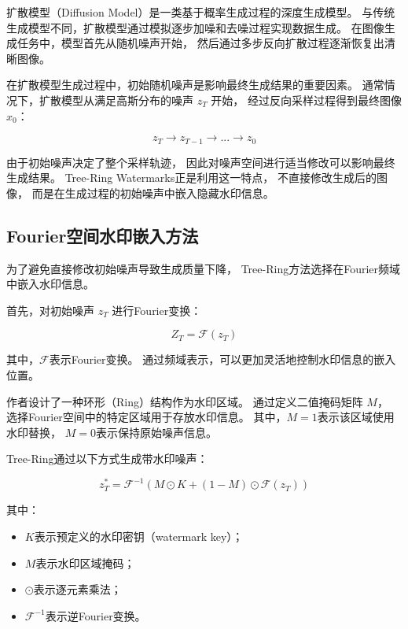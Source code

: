\documentclass[12pt,a4paper]{article}
\begin{document}
扩散模型（Diffusion Model）是一类基于概率生成过程的深度生成模型。
与传统生成模型不同，扩散模型通过模拟逐步加噪和去噪过程实现数据生成。
在图像生成任务中，模型首先从随机噪声开始，
然后通过多步反向扩散过程逐渐恢复出清晰图像。


在扩散模型生成过程中，初始随机噪声是影响最终生成结果的重要因素。
通常情况下，扩散模型从满足高斯分布的噪声 $z_T$ 开始，
经过反向采样过程得到最终图像 $x_0$：

\begin{equation}
z_T \rightarrow z_{T-1} \rightarrow ... \rightarrow z_0
\end{equation}


由于初始噪声决定了整个采样轨迹，
因此对噪声空间进行适当修改可以影响最终生成结果。
Tree-Ring Watermarks正是利用这一特点，
不直接修改生成后的图像，
而是在生成过程的初始噪声中嵌入隐藏水印信息。\subsection{Fourier空间水印嵌入方法}

为了避免直接修改初始噪声导致生成质量下降，
Tree-Ring方法选择在Fourier频域中嵌入水印信息。

首先，对初始噪声 $z_T$ 进行Fourier变换：

\begin{equation}
Z_T=\mathcal{F}(z_T)
\end{equation}

其中，$\mathcal{F}$表示Fourier变换。
通过频域表示，可以更加灵活地控制水印信息的嵌入位置。


作者设计了一种环形（Ring）结构作为水印区域。
通过定义二值掩码矩阵 $M$，
选择Fourier空间中的特定区域用于存放水印信息。
其中，$M=1$表示该区域使用水印替换，
$M=0$表示保持原始噪声信息。

Tree-Ring通过以下方式生成带水印噪声：

\begin{equation}
z_T^{*}
=
\mathcal{F}^{-1}
(
M\odot K+
(1-M)\odot\mathcal{F}(z_T)
)
\end{equation}

其中：

\begin{itemize}
    \item $K$表示预定义的水印密钥（watermark key）；
    \item $M$表示水印区域掩码；
    \item $\odot$表示逐元素乘法；
    \item $\mathcal{F}^{-1}$表示逆Fourier变换。
\end{itemize}
\end{document}

